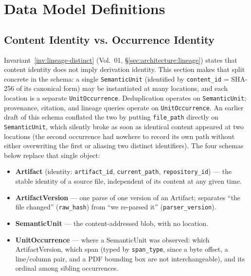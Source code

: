 ﻿%
\chapter{Data Model Definitions}
\label{app:data-model}

\section{Content Identity vs. Occurrence Identity}
\label{app:data-model:identity}

Invariant~\ref{inv:lineage-distinct} (Vol.~01, \S\ref{sec:architecture:lineage}) states that content identity does not imply derivation identity. This section makes that split concrete in the schema: a single \texttt{SemanticUnit} (identified by \texttt{content\_id} = SHA-256 of its canonical form) may be instantiated at many locations, and each location is a separate \texttt{UnitOccurrence}. Deduplication operates on \texttt{SemanticUnit}; provenance, citation, and lineage queries operate on \texttt{UnitOccurrence}. An earlier draft of this schema conflated the two by putting \texttt{file\_path} directly on \texttt{SemanticUnit}, which silently broke as soon as identical content appeared at two locations (the second occurrence had nowhere to record its own path without either overwriting the first or aliasing two distinct identifiers). The four schemas below replace that single object:

\begin{itemize}
  \item \textbf{Artifact} (identity: \texttt{artifact\_id}, \texttt{current\_path}, \texttt{repository\_id}) --- the stable identity of a source file, independent of its content at any given time.
  \item \textbf{ArtifactVersion} --- one parse of one version of an Artifact; separates ``the file changed'' (\texttt{raw\_hash}) from ``we re-parsed it'' (\texttt{parser\_version}).
  \item \textbf{SemanticUnit} --- the content-addressed blob, with no location.
  \item \textbf{UnitOccurrence} --- where a SemanticUnit was observed: which ArtifactVersion, which span (typed by \texttt{span\_type}, since a byte offset, a line/column pair, and a PDF bounding box are not interchangeable), and its ordinal among sibling occurrences.
\end{itemize}

